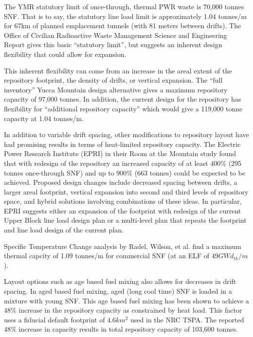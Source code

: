 The \gls{YMR} statutory limit of once-through, thermal PWR waste is 70,000 tonnes 
SNF.  That is to say, the statutory line load limit is approximately 1.04 tonnes/m
for 67km of planned emplacement tunnels (with 81 meters between drifts). The
Office of Civilian Radioactive Waste Management Science and Engineering Report
gives this basic ``statutory limit'', but suggests an inherent design
flexibility that could allow for expansion. 

This inherent flexibility can come from an increase in the areal extent of the 
repository footprint, the density of drifts, or vertical expansion. The  ``full inventory'' Yucca
Mountain design alternative gives a maximum repository capacity of 97,000
tonnes. In addition, the current design for the repository has flexibility for
``additional repository capacity'' which would give a 119,000 tonne capacity at
1.04 tonnes/m.\cite{doe_yucca_2002}

In addition to variable drift spacing, other modifications to repository layout
have had promising results in terms of heat-limited repository capacity. The
Electric Power Research Institute (EPRI) in their Room at the Mountain study
found that with redesign of the repository an increased capacity of at least
$400\%$ (295 tonnes once-through SNF) and up to $900\%$ (663 tonnes) could be
expected to be achieved. Proposed design changes include decreased spacing
between drifts, a larger areal footprint, vertical expansion into second and
third levels of repository space, and hybrid solutions involving combinations
of these ideas. In particular, EPRI suggests either an expansion of the
footprint with redesign of the current Upper Block line load design plan or a
multi-level plan that repeats the footprint and line load design of the current
plan\cite{kessler_room_2006}.

Specific Temperature Change analysis by Radel, Wilson, et al. find a maximum
thermal capcity of 1.09 tonnes/m for commercial SNF (at an ELF of $49
GWd_{th}/m$)\cite{radel_effect_2007}. 

Layout options such as age based fuel mixing also allows for decreases in drift 
spacing. In aged based fuel mixing, aged (long cool time) SNF is loaded in a 
mixture with young SNF. This age based fuel mixing has been shown to achieve a 
$48\%$ increase in the repository capacity as constrained by heat
load\cite{nicholson_thermal_2007}. This factor uses a fiducial default
footprint of $4.6 km^2$ used in the NRC TSPA.  The reported $48\%$ increase in
capacity results in total repository capacity of 103,600
tonnes\cite{williams_contract_2001}.


